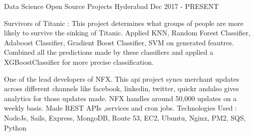 \begin{cventries}


  \cventry
    {Data Science} %
    {Open Source Projects} %
    {Hyderabad} %
    {Dec 2017 - PRESENT} %
    {
      \begin{cvitems} %
        \item {Survivors of Titanic : This project determines what groups of people are more likely to survive the sinking of Titanic. Applied KNN, Random Forest Classifier, Adaboost Classifier, Gradient Boost Classifier, SVM on generated feautres. Combined all the predictions made by these classifiers and applied a XGBoostClassifier for more precise classification.}
        \item {One of the lead developers of NFX. This api project syncs merchant updates across different channels like facebook, linkedin, twitter, quickr andalso gives analytics for those updates made. NFX handles around 50,000 updates on a weekly basis. Made REST APIs ,services and cron jobs. Technologies Used : NodeJs, Sails, Express, MongoDB, Route 53, EC2, Ubuntu, Nginx, PM2, SQS, Python}
      \end{cvitems}
    }
\end{cventries}

